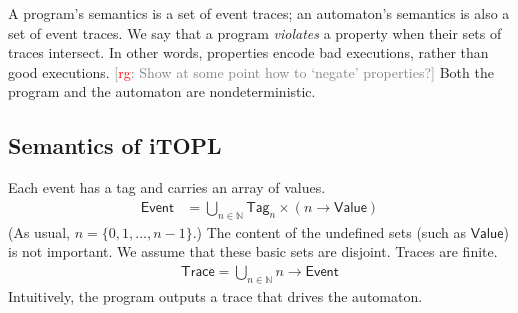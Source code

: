 \documentclass[preprint]{sigplanconf} %
\newcommand{\note}[2]{\textcolor{gray}{[\textcolor{red}{#1}: #2]}}
\newcommand{\rg}[1]{\note{rg}{#1}}
\newcommand{\N}{\ensuremath{\mathbb{N}}}
\newcommand{\set}[1]{\ensuremath{\mathsf{#1}}}
\theoremstyle{definition}
\theoremstyle{remark}
\begin{document}
A program's semantics is a set of event traces;
an automaton's semantics is also a set of event traces.
We say that a program \emph{violates} a property when their sets of traces intersect.
In other words, properties encode bad executions, rather than good executions.
\rg{Show at some point how to `negate' properties?}
Both the program and the automaton are nondeterministic.

\subsection{Semantics of iTOPL}\label{sec:semantics.itopl} %

Each event has a tag and carries an array of values.
\begin{align}
\set{Event}&=\bigcup_{n\in\N}\set{Tag}_n\times(n\to\set{Value})
\end{align}
(As usual, $n=\{0,1,\ldots,n-1\}$.)
The content of the undefined sets (such as \set{Value}) is not important.
We assume that these basic sets are disjoint.
Traces are finite.
\begin{align}
\set{Trace}=\bigcup_{n\in\N} n\to\set{Event} \label{eq:trace}
\end{align}
Intuitively, the program outputs a trace that drives the automaton.
\end{document}
